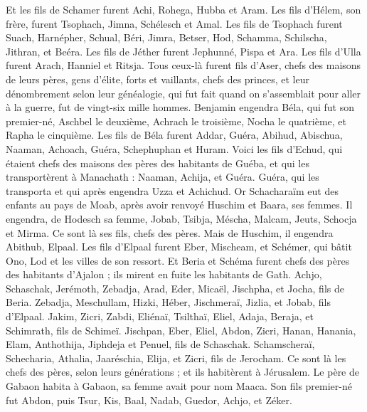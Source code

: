 \begin{multicols}{2}
Et les fils de Schamer furent Achi, Rohega, Hubba et Aram.
Les fils d'Hélem, son frère, furent Tsophach, Jimna, Schélesch et Amal.
Les fils de Tsophach furent Suach, Harnépher, Schual, Béri, Jimra,
Betser, Hod, Schamma, Schilscha, Jithran, et Beéra.
Les fils de Jéther furent Jephunné, Pispa et Ara.
Les fils d'Ulla furent Arach, Hanniel et Ritsja.
Tous ceux-là furent fils d'Aser, chefs des maisons de leurs pères, gens d'élite, forts et vaillants, chefs des princes, et leur dénombrement selon leur généalogie, qui fut fait quand on s'assemblait pour aller à la guerre, fut de vingt-six mille hommes.
\VerseOne{}Benjamin engendra Béla, qui fut son premier-né, Aschbel le deuxième, Achrach le troisième,
Nocha le quatrième, et Rapha le cinquième.
Les fils de Béla furent Addar, Guéra, Abihud,
Abischua, Naaman, Achoach,
Guéra, Schephuphan et Huram.
Voici les fils d'Echud, qui étaient chefs des maisons des pères des habitants de Guéba, et qui les transportèrent à Manachath :
Naaman, Achija, et Guéra. Guéra, qui les transporta et qui après engendra Uzza et Achichud.
Or Schacharaïm eut des enfants au pays de Moab, après avoir renvoyé Huschim et Baara, ses femmes.
Il engendra, de Hodesch sa femme, Jobab, Tsibja, Méscha, Malcam,
Jeuts, Schocja et Mirma. Ce sont là ses fils, chefs des pères.
Mais de Huschim, il engendra Abithub, Elpaal.
Les fils d'Elpaal furent Eber, Mischeam, et Schémer, qui bâtit Ono, Lod et les villes de son ressort.
Et Beria et Schéma furent chefs des pères des habitants d'Ajalon ; ils mirent en fuite les habitants de Gath.
Achjo, Schaschak, Jerémoth,
Zebadja, Arad, Eder,
Micaël, Jischpha, et Jocha, fils de Beria.
Zebadja, Meschullam, Hizki, Héber,
Jischmeraï, Jizlia, et Jobab, fils d'Elpaal.
Jakim, Zicri, Zabdi,
Eliénaï, Tsilthaï, Eliel,
Adaja, Beraja, et Schimrath, fils de Schimeï.
Jischpan, Eber, Eliel,
Abdon, Zicri, Hanan,
Hanania, Elam, Anthothija,
Jiphdeja et Penuel, fils de Schaschak.
Schamscheraï, Schecharia, Athalia,
Jaaréschia, Elija, et Zicri, fils de Jerocham.
Ce sont là les chefs des pères, selon leurs générations ; et ils habitèrent à Jérusalem.
Le père de Gabaon habita à Gabaon, sa femme avait pour nom Maaca.
Son fils premier-né fut Abdon, puis Tsur, Kis, Baal, Nadab,
Guedor, Achjo, et Zéker.

\end{multicols}
